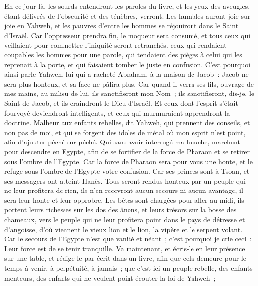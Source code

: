 \begin{multicols}{2}
En ce jour-là, les sourds entendront les paroles du livre, et les yeux des aveugles, étant délivrés de l'obscurité et des ténèbres, verront.
Les humbles auront joie sur joie en Yahweh, et les pauvres d'entre les hommes se réjouiront dans le Saint d'Israël.
Car l'oppresseur prendra fin, le moqueur sera consumé, et tous ceux qui veillaient pour commettre l'iniquité seront retranchés,
ceux qui rendaient coupables les hommes pour une parole, qui tendaient des pièges à celui qui les reprenait à la porte, et qui faisaient tomber le juste en confusion.
C'est pourquoi ainsi parle Yahweh, lui qui a racheté Abraham, à la maison de Jacob~: Jacob ne sera plus honteux, et sa face ne pâlira plus.
Car quand il verra ses fils, ouvrage de mes mains, au milieu de lui, ils sanctifieront mon Nom~; ils sanctifieront, dis-je, le Saint de Jacob, et ils craindront le Dieu d'Israël.
Et ceux dont l'esprit s'était fourvoyé deviendront intelligents, et ceux qui murmuraient apprendront la doctrine.
\VerseOne{}Malheur aux enfants rebelles, dit Yahweh, qui prennent des conseils, et non pas de moi, et qui se forgent des idoles de métal où mon esprit n'est point, afin d'ajouter péché sur péché.
Qui sans avoir interrogé ma bouche, marchent pour descendre en Egypte, afin de se fortifier de la force de Pharaon et se retirer sous l'ombre de l'Egypte.
Car la force de Pharaon sera pour vous une honte, et le refuge sous l'ombre de l'Egypte votre confusion.
Car ses princes sont à Tsoan, et ses messagers ont atteint Hanès.
Tous seront rendus honteux par un peuple qui ne leur profitera de rien, ils n'en recevront aucun secours ni aucun avantage, il sera leur honte et leur opprobre.
Les bêtes sont chargées pour aller au midi, ils portent leurs richesses sur les dos des ânons, et leurs trésors sur la bosse des chameaux, vers le peuple qui ne leur profitera point dans le pays de détresse et d'angoisse, d'où viennent le vieux lion et le lion, la vipère et le serpent volant.
Car le secours de l'Egypte n'est que vanité et néant~; c'est pourquoi je crie ceci~: Leur force est de se tenir tranquille.
Va maintenant, et écris-le en leur présence sur une table, et rédige-le par écrit dans un livre, afin que cela demeure pour le temps à venir, à perpétuité, à jamais~;
que c'est ici un peuple rebelle, des enfants menteurs, des enfants qui ne veulent point écouter la loi de Yahweh~;

\end{multicols}
